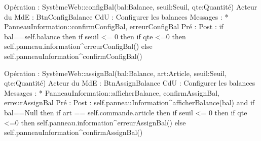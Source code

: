 Opération : SystèmeWeb::configBal(bal:Balance, seuil:Seuil, qte:Quantité)
Acteur du MdE : BtnConfigBalance 
CdU : Configurer les balances
Messages : 
* PanneauInformation::{confirmConfigBal, erreurConfigBal}
Pré :
Post :  
        if bal==self.balance then
                if seuil <= 0 then
                        if qte <=0 then
                                self.panneau.information^erreurConfigBal()
        else
                self.panneauInformation^confirmConfigBal()


Opération : SystèmeWeb::assignBal(bal:Balance, art:Article, seuil:Seuil, qte:Quantité)
Acteur du MdE : BtnAssignBalance 
CdU : Configurer les balances
Messages :
* PanneauInformation::{afficherBalance, confirmAssignBal, erreurAssignBal}
Pré :
Post : 
        self.panneauInformation^afficherBalance(bal)
and
        if bal==Null then
                if art == self.commande.article then
                        if seuil <= 0 then
                                if qte <=0 then
                                        self.panneau.information^erreurAssignBal()
        else
                self.panneauInformation^confirmAssignBal()